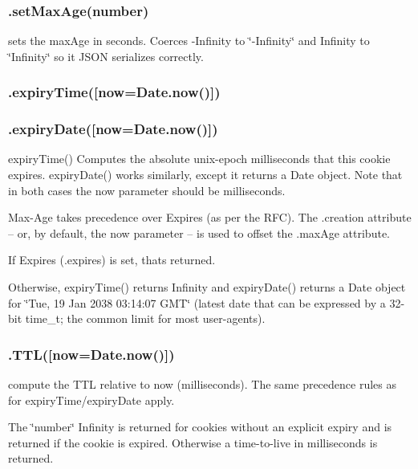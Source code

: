 \subsubsection*{{\ttfamily .set\+Max\+Age(number)}}

sets the max\+Age in seconds. Coerces {\ttfamily -\/\+Infinity} to {\ttfamily \char`\"{}-\/\+Infinity\char`\"{}} and {\ttfamily Infinity} to {\ttfamily \char`\"{}\+Infinity\char`\"{}} so it J\+S\+ON serializes correctly.

\subsubsection*{{\ttfamily .expiry\+Time(\mbox{[}now=Date.\+now()\mbox{]})}}

\subsubsection*{{\ttfamily .expiry\+Date(\mbox{[}now=Date.\+now()\mbox{]})}}

expiry\+Time() Computes the absolute unix-\/epoch milliseconds that this cookie expires. expiry\+Date() works similarly, except it returns a {\ttfamily Date} object. Note that in both cases the {\ttfamily now} parameter should be milliseconds.

Max-\/\+Age takes precedence over Expires (as per the R\+FC). The {\ttfamily .creation} attribute -- or, by default, the {\ttfamily now} parameter -- is used to offset the {\ttfamily .max\+Age} attribute.

If Expires ({\ttfamily .expires}) is set, that\textquotesingle{}s returned.

Otherwise, {\ttfamily expiry\+Time()} returns {\ttfamily Infinity} and {\ttfamily expiry\+Date()} returns a {\ttfamily Date} object for \char`\"{}\+Tue, 19 Jan 2038 03\+:14\+:07 G\+M\+T\char`\"{} (latest date that can be expressed by a 32-\/bit {\ttfamily time\+\_\+t}; the common limit for most user-\/agents).

\subsubsection*{{\ttfamily .T\+TL(\mbox{[}now=Date.\+now()\mbox{]})}}

compute the T\+TL relative to {\ttfamily now} (milliseconds). The same precedence rules as for {\ttfamily expiry\+Time}/{\ttfamily expiry\+Date} apply.

The \char`\"{}number\char`\"{} {\ttfamily Infinity} is returned for cookies without an explicit expiry and {} is returned if the cookie is expired. Otherwise a time-\/to-\/live in milliseconds is returned.

